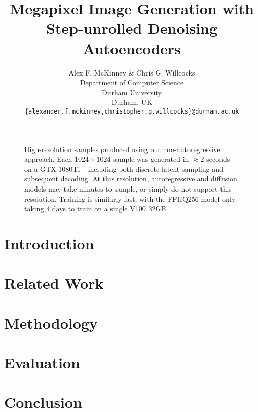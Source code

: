 \documentclass{article} %
\title{Megapixel Image Generation with Step-unrolled Denoising Autoencoders}
\author{Alex F. McKinney \& Chris G. Willcocks \\
Department of Computer Science\\
Durham University\\
Durham, UK \\
\texttt{\{alexander.f.mckinney,christopher.g.willcocks\}@durham.ac.uk} \\
}
\begin{document}
\maketitle

\begin{abstract}
    
\end{abstract}

\begin{figure}[ht]
    \centering
    \caption{
        High-resolution samples produced using our non-autoregressive approach.
        Each $1024 \times 1024$ sample was generated in $\approx 2$ seconds on a
        GTX 1080Ti -- including both discrete latent sampling and subsequent
        decoding. At this resolution, autoregressive and diffusion models may
        take minutes to sample, or simply do not support this resolution.
        Training is similarly fast, with the FFHQ256 model only taking 4 days to
        train on a single V100 32GB.
    }
\end{figure}

\section{Introduction}\label{sec:intro}


\section{Related Work}\label{sec:related}


\section{Methodology}\label{sec:method}


\section{Evaluation}\label{sec:evaluation}


\section{Conclusion}\label{sec:conclusion}



{\small }
\end{document}
